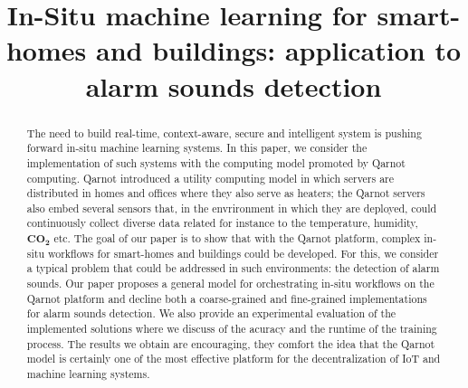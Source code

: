 \documentclass[10pt, conference, compsocconf]{IEEEtran}
\begin{document}
%
\title{In-Situ machine learning for smart-homes and buildings: application to alarm sounds detection}



\author{
\and
{}
\and
{}
}

\maketitle


\begin{abstract}
The need to build real-time, context-aware, secure and intelligent system is pushing forward in-situ machine learning systems. 
In this paper, we consider the implementation of such systems with the computing model promoted by 
Qarnot computing. Qarnot introduced a utility computing model in which servers are distributed in homes and offices where they also 
serve as heaters; the Qarnot servers also embed several sensors that, in the envrironment in which they are deployed, could continuously 
collect diverse data related for instance to the temperature, humidity, $\mathbf{CO_2}$ etc. The goal of our paper is to show that with the Qarnot 
platform, complex in-situ workflows for smart-homes and buildings could be developed. For this, we consider a typical problem that could be addressed in such environments: the detection of alarm sounds. Our paper proposes a general model for 
orchestrating in-situ workflows on 
the Qarnot platform and decline both a coarse-grained and fine-grained implementations for alarm sounds detection. 
We also provide an experimental evaluation of the implemented solutions where we discuss of the acuracy and the runtime of the training process. The results we obtain are encouraging, they comfort the idea that the Qarnot model is certainly one of the most effective platform for the decentralization of IoT and machine learning systems. 
\end{abstract}
\end{document}
